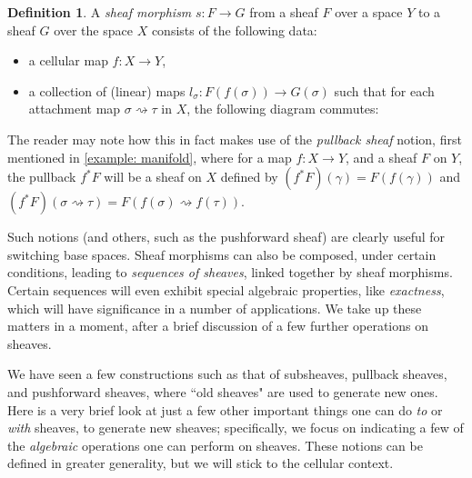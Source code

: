 \documentclass[a4paper]{book}
\theoremstyle{definition}
\theoremstyle{definition}
\newtheorem{definition}{Definition}[section]
\theoremstyle{definition}
\theoremstyle{theorem}
\theoremstyle{definition}
\begin{document}
		\begin{definition}
			A \textit{sheaf morphism} $s: F \rightarrow G$ from a sheaf $F$ over a space $Y$ to a sheaf $G$ over the space $X$ consists of the following data: 
			\begin{itemize}
				\item a cellular map $f: X \rightarrow Y$, 
				\item a collection of (linear) maps $l_{\sigma}: F(f(\sigma)) \rightarrow G(\sigma)$ such that for each attachment map $\sigma \rightsquigarrow \tau$ in $X$, the following diagram commutes: 
					\begin{center}  
				\end{center}  
			\end{itemize}
		\end{definition} \noindent 
	The reader may note how this in fact makes use of the \textit{pullback sheaf} notion, first mentioned in \ref{example: manifold}, where for a map $f: X \rightarrow Y$, and a sheaf $F$ on $Y$, the pullback $f^*F$ will be a sheaf on $X$ defined by $(f^*F)(\gamma) = F(f(\gamma))$ and $(f^*F)(\sigma \rightsquigarrow \tau) = F(f(\sigma) \rightsquigarrow f(\tau))$. \par 
	Such notions (and others, such as the pushforward sheaf) are clearly useful for switching base spaces. Sheaf morphisms can also be composed, under certain conditions, leading to \textit{sequences of sheaves}, linked together by sheaf morphisms. Certain sequences will even exhibit special algebraic properties, like \textit{exactness}, which will have significance in a number of applications. We take up these matters in a moment, after a brief discussion of a few further operations on sheaves. \par 
	We have seen a few constructions such as that of subsheaves, pullback sheaves, and  pushforward sheaves, where ``old sheaves" are used to generate new ones. Here is a very brief look at just a few other important things one can do \textit{to} or \textit{with} sheaves, to generate new sheaves; specifically, we focus on indicating a few of the \textit{algebraic} operations one can perform on sheaves. These notions can be defined in greater generality, but we will stick to the cellular context. 
\end{document}
